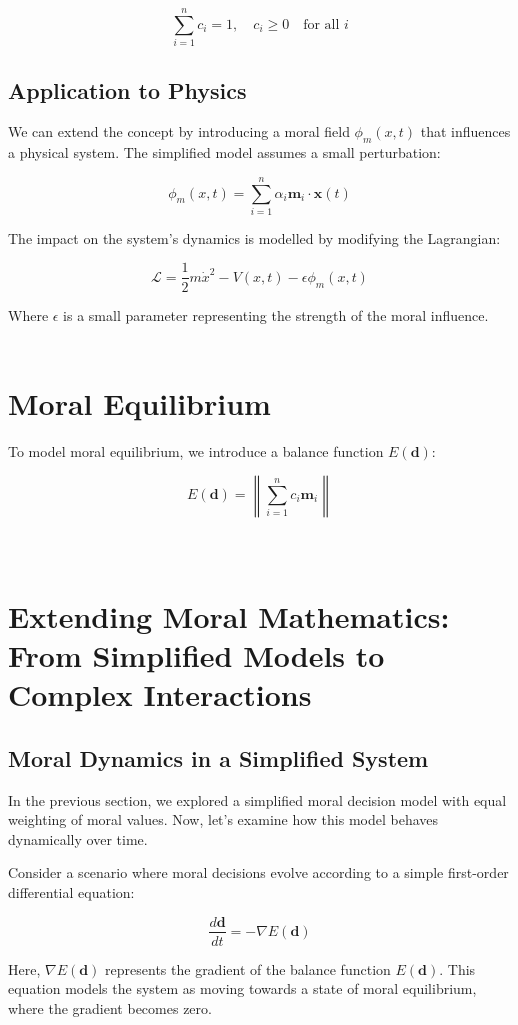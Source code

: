 \documentclass{article}
\begin{document}
\[
\sum_{i=1}^{n} c_i = 1, \quad c_i \geq 0 \quad \text{for all } i
\]

\subsection{Application to Physics}

We can extend the concept by introducing a moral field \( \phi_m(x, t) \) that influences a physical system. The simplified model assumes a small perturbation:

\[
\phi_m(x, t) = \sum_{i=1}^{n} \alpha_i \mathbf{m}_i \cdot \mathbf{x}(t)
\]


The impact on the system’s dynamics is modelled by modifying the Lagrangian:

\[
\mathcal{L} = \frac{1}{2} m \dot{x}^2 - V(x, t) - \epsilon \phi_m(x, t)
\]

Where \( \epsilon \) is a small parameter representing the strength of the moral influence.
\\
\

\section{Moral Equilibrium}

To model moral equilibrium, we introduce a balance function \( E(\mathbf{d}) \):

\[
E(\mathbf{d}) = \left\lVert \sum_{i=1}^{n} c_i \mathbf{m}_i \right\rVert
\]
\\
\

\section{Extending Moral Mathematics: From Simplified Models to Complex Interactions}

\subsection{Moral Dynamics in a Simplified System}

In the previous section, we explored a simplified moral decision model with equal weighting of moral values. Now, let's examine how this model behaves dynamically over time.

Consider a scenario where moral decisions evolve according to a simple first-order differential equation:

\[
\frac{d\mathbf{d}}{dt} = -\nabla E(\mathbf{d})
\]

Here, \( \nabla E(\mathbf{d}) \) represents the gradient of the balance function \( E(\mathbf{d}) \). This equation models the system as moving towards a state of moral equilibrium, where the gradient becomes zero.
\end{document}
